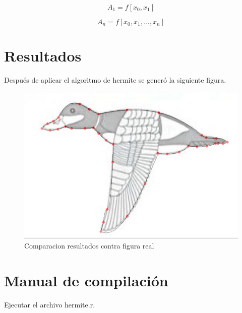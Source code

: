 \documentclass{article}
\begin{document}
\begin{equation} \label{eu_eqn}
A_1 = f[x_0,x_1]
\end{equation}

\begin{equation} \label{eu_eqn}
A_n = f[x_0,x_1,...,x_n]
\end{equation}

\newpage

\section{Resultados}

Después de aplicar el algoritmo de hermite se generó la siguiente figura.

\begin{figure}[h!]
\centering
\includegraphics[scale=0.3]{pat.jpg}
\caption{Comparacion resultados contra figura real}
\label{fig:fisica}
\end{figure}


\section{Manual de compilación}

Ejecutar el archivo hermite.r.
\end{document}

